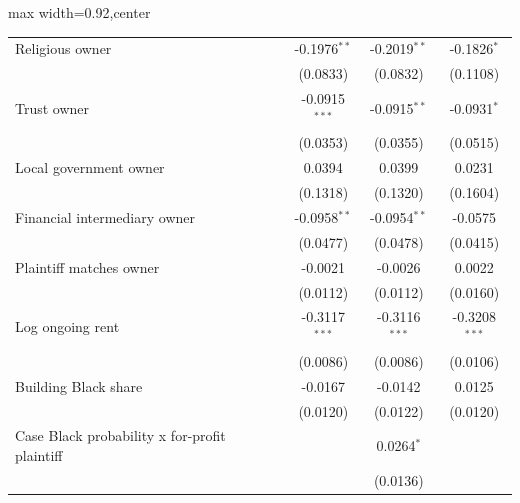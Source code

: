 \begin{table}[htbp]
\begin{adjustbox}{max width=0.92\textwidth,center}
\begin{tabular}{lcccc}
         Religious owner                               &                & -0.1976$^{**}$  & -0.2019$^{**}$  & -0.1826$^{*}$\\   
                                                       &                & (0.0833)        & (0.0832)        & (0.1108)\\   
         Trust owner                                   &                & -0.0915$^{***}$ & -0.0915$^{**}$  & -0.0931$^{*}$\\   
                                                       &                & (0.0353)        & (0.0355)        & (0.0515)\\   
         Local government owner                        &                & 0.0394          & 0.0399          & 0.0231\\   
                                                       &                & (0.1318)        & (0.1320)        & (0.1604)\\   
         Financial intermediary owner                  &                & -0.0958$^{**}$  & -0.0954$^{**}$  & -0.0575\\   
                                                       &                & (0.0477)        & (0.0478)        & (0.0415)\\   
         Plaintiff matches owner                       &                & -0.0021         & -0.0026         & 0.0022\\   
                                                       &                & (0.0112)        & (0.0112)        & (0.0160)\\   
         Log ongoing rent                              &                & -0.3117$^{***}$ & -0.3116$^{***}$ & -0.3208$^{***}$\\   
                                                       &                & (0.0086)        & (0.0086)        & (0.0106)\\   
         Building Black share                          &                & -0.0167         & -0.0142         & 0.0125\\   
                                                       &                & (0.0120)        & (0.0122)        & (0.0120)\\   
         Case Black probability x for-profit plaintiff &                &                 & 0.0264$^{*}$    &   \\   
                                                       &                &                 & (0.0136)        &   \\   

\end{tabular}
\end{adjustbox}
\end{table}
